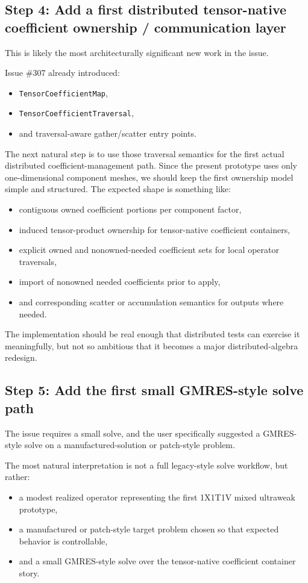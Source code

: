 \documentclass[11pt]{article}
\begin{document}
\subsection{Step 4: Add a first distributed tensor-native coefficient ownership / communication layer}

This is likely the most architecturally significant new work in the issue.

Issue \#307 already introduced:
\begin{itemize}[leftmargin=2em]
\item \texttt{TensorCoefficientMap},
\item \texttt{TensorCoefficientTraversal},
\item and traversal-aware gather/scatter entry points.
\end{itemize}

The next natural step is to use those traversal semantics for the first actual distributed coefficient-management path. Since the present prototype uses only one-dimensional component meshes, we should keep the first ownership model simple and structured. The expected shape is something like:
\begin{itemize}[leftmargin=2em]
\item contiguous owned coefficient portions per component factor,
\item induced tensor-product ownership for tensor-native coefficient containers,
\item explicit owned and nonowned-needed coefficient sets for local operator traversals,
\item import of nonowned needed coefficients prior to apply,
\item and corresponding scatter or accumulation semantics for outputs where needed.
\end{itemize}

The implementation should be real enough that distributed tests can exercise it meaningfully, but not so ambitious that it becomes a major distributed-algebra redesign.

\subsection{Step 5: Add the first small GMRES-style solve path}

The issue requires a small solve, and the user specifically suggested a GMRES-style solve on a manufactured-solution or patch-style problem.

The most natural interpretation is not a full legacy-style solve workflow, but rather:
\begin{itemize}[leftmargin=2em]
\item a modest realized operator representing the first 1X1T1V mixed ultraweak prototype,
\item a manufactured or patch-style target problem chosen so that expected behavior is controllable,
\item and a small GMRES-style solve over the tensor-native coefficient container story.
\end{itemize}
\end{document}
